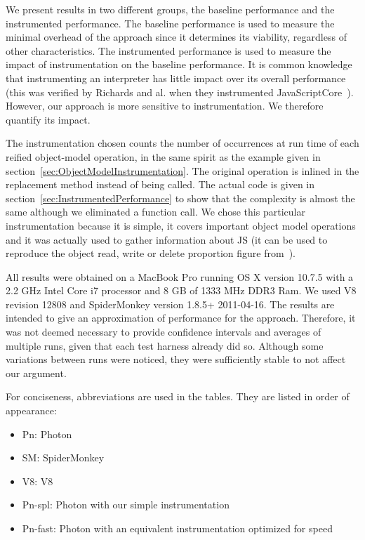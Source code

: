 We present results in two different groups, the baseline performance and the
instrumented performance.  The baseline performance is used to measure the
minimal overhead of the approach since it determines its viability, regardless
of other characteristics.  The instrumented performance is used to measure the
impact of instrumentation on the baseline performance. It is common knowledge
that instrumenting an interpreter has little impact over its overall
performance (this was verified by Richards and al. when they instrumented
JavaScriptCore~\cite{behavior_js}).  However, our approach is more sensitive to
instrumentation. We therefore quantify its impact. 

The instrumentation chosen counts the number of occurrences at run time of each
reified object-model operation, in the same spirit as the example given in
section~\ref{sec:ObjectModelInstrumentation}. The original operation is inlined
in the replacement method instead of being called. The actual code is given in
section~\ref{sec:InstrumentedPerformance} to show that the complexity is almost
the same although we eliminated a function call.  We chose this particular
instrumentation because it is simple, it covers important object model
operations and it was actually used to gather information about JS (it can be
used to reproduce the object read, write or delete proportion figure
from~\cite{behavior_js}).

All results were obtained on a MacBook Pro running OS X version 10.7.5 with a
2.2 GHz Intel Core i7 processor and 8 GB of 1333 MHz DDR3 Ram. We used V8
revision 12808 and SpiderMonkey version 1.8.5+ 2011-04-16. The results are
intended to give an approximation of performance for the approach. Therefore,
it was not deemed necessary to provide confidence intervals and averages of
multiple runs, given that each test harness already did so. Although some
variations between runs were noticed, they were sufficiently stable to not
affect our argument.

For conciseness, abbreviations are used in the tables. They are listed in order
of appearance:
\begin{itemize}
    \item Pn: Photon
    \item SM: SpiderMonkey
    \item V8: V8
    \item Pn-spl: Photon with our simple instrumentation
    \item Pn-fast: Photon with an equivalent instrumentation optimized for speed
\end{itemize}


